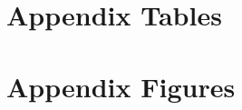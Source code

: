 \documentclass{article}
\begin{document}
\clearpage
\nocite{*}
\printbibliography


\clearpage

\section*{}
\vspace{5mm}

\appendix

\renewcommand\thetable{\thesection.\arabic{table}}    
\renewcommand\thefigure{\thesection.\arabic{figure}} 
\setcounter{table}{0}
\setcounter{figure}{0}

\section{Appendix Tables}


\clearpage
\section{Appendix Figures}



\end{document}
